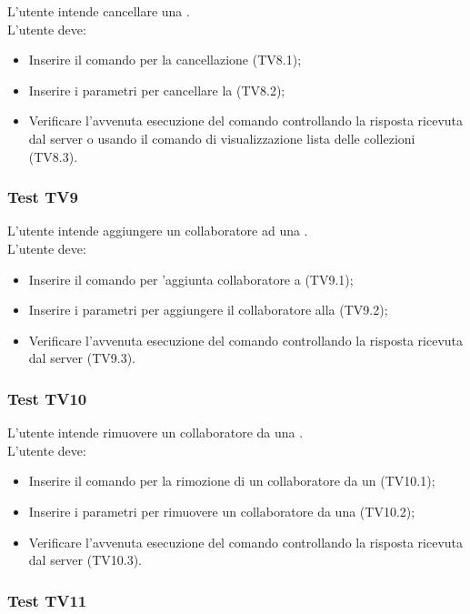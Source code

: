 \documentclass{scalatekids-article}
\begin{document}
L'utente intende cancellare una .\\
L'utente deve:
\begin{itemize}
\item Inserire il comando per la cancellazione  (TV8.1);
\item Inserire i parametri per cancellare la  (TV8.2);
\item Verificare l'avvenuta esecuzione del comando controllando la risposta ricevuta dal server o usando il comando di visualizzazione lista delle collezioni (TV8.3).
\end{itemize}

\subsubsection{Test TV9}

L'utente intende aggiungere un collaboratore ad una .\\
L'utente deve:
\begin{itemize}
\item Inserire il comando per 'aggiunta collaboratore a  (TV9.1);
\item Inserire i parametri per aggiungere il collaboratore alla   (TV9.2);
\item Verificare l'avvenuta esecuzione del comando controllando la risposta ricevuta dal server (TV9.3).
\end{itemize}


\subsubsection{Test TV10}

L'utente intende rimuovere un collaboratore da una .\\
L'utente deve:
\begin{itemize}
\item Inserire il comando per la rimozione di un collaboratore da un  (TV10.1);
\item Inserire i parametri per rimuovere un collaboratore da una  (TV10.2);
\item Verificare l'avvenuta esecuzione del comando controllando la risposta ricevuta dal server (TV10.3).
\end{itemize}

\subsubsection{Test TV11}
\end{document}
